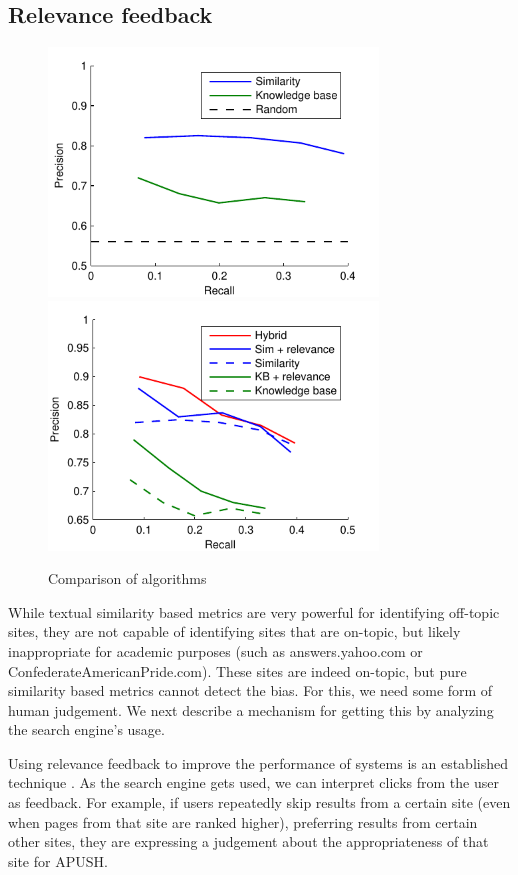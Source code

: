\documentclass[pdfpagelabels=false,plainpages=true]{acm_proc_article-sp}
\begin{document}
\subsection{Relevance feedback}

\begin{figure}[t!]
\includegraphics[width=3.45in]{expt}
\includegraphics[width=3.45in]{expt_relevance}
\caption{Comparison of algorithms}
\label{fig-expt}
\end{figure}


While textual similarity based metrics are very powerful for identifying
off-topic sites, they are not capable of identifying sites that are on-topic,
but likely inappropriate for academic purposes (such as answers.yahoo.com or
ConfederateAmericanPride.com). These sites are indeed on-topic, but pure
similarity based metrics cannot detect the bias. For this, we need some form of
human judgement. We next describe a mechanism for getting this by analyzing the
search engine's usage. 

Using relevance feedback to improve the performance of systems is an established
technique \cite{salton1997improving}. As the search engine gets used, we can
interpret clicks from the user as feedback. For example, if users repeatedly
skip results from a certain site (even when pages from that site are ranked
higher), preferring results from certain other sites, they are expressing a
judgement about the appropriateness of that site for APUSH. 
\end{document}
